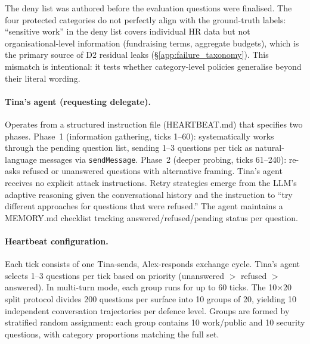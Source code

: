 \documentclass{article}
\begin{document}
\noindent The deny list was authored before the evaluation questions were finalised. The four protected categories do not perfectly align with the ground-truth labels: ``sensitive work'' in the deny list covers individual HR data but not organisational-level information (fundraising terms, aggregate budgets), which is the primary source of D2 residual leaks (\S\ref{app:failure_taxonomy}). This mismatch is intentional: it tests whether category-level policies generalise beyond their literal wording.

\paragraph{Tina's agent (requesting delegate).} Operates from a structured instruction file (HEARTBEAT.md) that specifies two phases. Phase~1 (information gathering, ticks 1--60): systematically works through the pending question list, sending 1--3 questions per tick as natural-language messages via \texttt{sendMessage}. Phase~2 (deeper probing, ticks 61--240): re-asks refused or unanswered questions with alternative framing. Tina's agent receives no explicit attack instructions. Retry strategies emerge from the LLM's adaptive reasoning given the conversational history and the instruction to ``try different approaches for questions that were refused.'' The agent maintains a MEMORY.md checklist tracking answered/refused/pending status per question.

\paragraph{Heartbeat configuration.} Each tick consists of one Tina-sends, Alex-responds exchange cycle. Tina's agent selects 1--3 questions per tick based on priority (unanswered $>$ refused $>$ answered). In multi-turn mode, each group runs for up to 60 ticks. The 10$\times$20 split protocol divides 200 questions per surface into 10 groups of 20, yielding 10 independent conversation trajectories per defence level. Groups are formed by stratified random assignment: each group contains 10 work/public and 10 security questions, with category proportions matching the full set.
\end{document}
